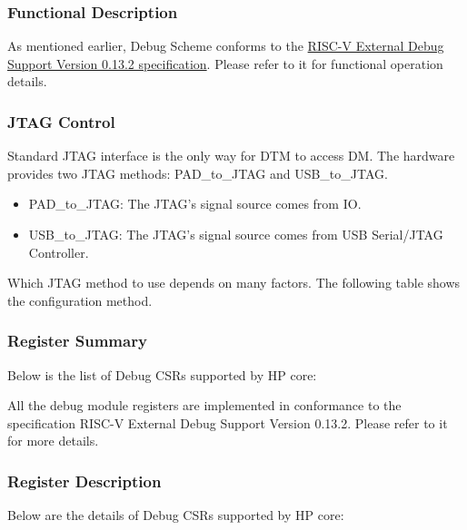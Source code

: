 \documentclass[main\_\_EN.tex]{subfiles}
\begin{document}
\subsubsection{Functional Description}
\label{sec:riscvcpu-dbg-func-descr}

As mentioned earlier, Debug Scheme conforms to the \href{https://riscv.org/wp-content/uploads/2019/03/riscv-debug-release.pdf} {RISC-V External Debug Support Version 0.13.2 specification}. Please refer to it for functional operation details.

\subsubsection{JTAG Control}
\label{sec:riscvcpu-dbg-jtag-cntl}

Standard JTAG interface is the only way for DTM to access DM. The hardware provides two JTAG methods: PAD\_to\_JTAG and USB\_to\_JTAG.

\begin{itemize}
    \item {PAD\_to\_JTAG: The JTAG's signal source comes from IO.}
    \item {USB\_to\_JTAG: The JTAG's signal source comes from USB Serial/JTAG Controller.}
\end{itemize}

Which JTAG method to use depends on many factors. The following table shows the configuration method.






\hypertarget{riscvcpu-dbg-reg-summ}{}
\subsubsection{Register Summary}
\label{sec:riscvcpu-dbg-reg-summ}

Below is the list of Debug CSRs supported by HP core:


All the debug module registers are implemented in conformance to the specification RISC-V External Debug Support Version 0.13.2. Please refer to it for more details.



\subsubsection{Register Description}
Below are the details of Debug CSRs supported by HP core:
\end{document}
